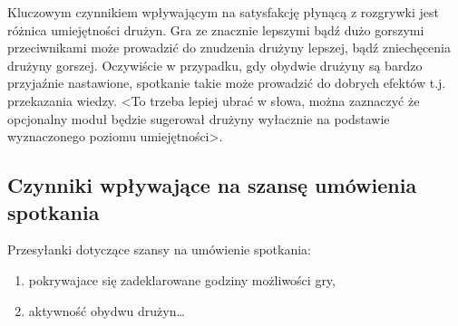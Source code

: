 \documentclass[a4paper,11pt]{article}
\begin{document}
Kluczowym czynnikiem wpływającym na satysfakcję płynącą z rozgrywki jest różnica umiejętności drużyn. Gra ze znacznie lepszymi bądź dużo gorszymi przeciwnikami może prowadzić do znudzenia drużyny lepszej, bądź zniechęcenia drużyny gorszej. Oczywiście w przypadku, gdy obydwie drużyny są bardzo przyjaźnie nastawione, spotkanie takie może prowadzić do dobrych efektów t.j. przekazania wiedzy. <To trzeba lepiej ubrać w słowa, można zaznaczyć że opcjonalny moduł będzie sugerował drużyny wyłacznie na podstawie wyznaczonego poziomu umiejętności>.



\subsection{Czynniki wpływające na szansę umówienia spotkania}

Przesyłanki dotyczące szansy na umówienie spotkania:

\begin{enumerate}
\item pokrywajace się zadeklarowane godziny możliwości gry,
\item aktywność obydwu drużyn\ldots
\end{enumerate}
\end{document}
